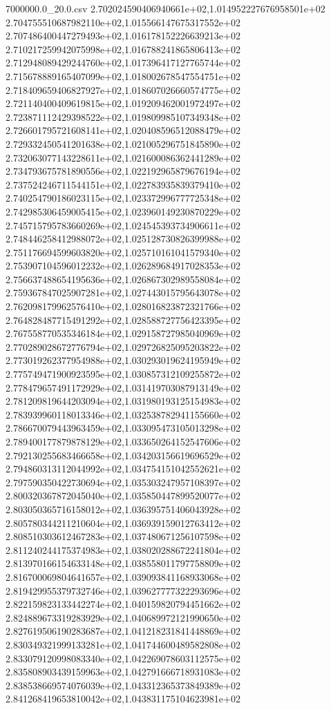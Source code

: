 \begin{filecontents*}{7000000.0_20.0.csv}
2.702024590406940661e+02,1.014952227676958501e+02
2.704755510687982110e+02,1.015566147675317552e+02
2.707486400447279493e+02,1.016178152226639213e+02
2.710217259942075998e+02,1.016788241865806413e+02
2.712948089429244760e+02,1.017396417127765744e+02
2.715678889165407099e+02,1.018002678547554751e+02
2.718409659406827927e+02,1.018607026660574775e+02
2.721140400409619815e+02,1.019209462001972497e+02
2.723871112429398522e+02,1.019809985107349348e+02
2.726601795721608141e+02,1.020408596512088479e+02
2.729332450541201638e+02,1.021005296751845890e+02
2.732063077143228611e+02,1.021600086362441289e+02
2.734793675781890556e+02,1.022192965879676194e+02
2.737524246711544151e+02,1.022783935839379410e+02
2.740254790186023115e+02,1.023372996777725348e+02
2.742985306459005415e+02,1.023960149230870229e+02
2.745715795783660269e+02,1.024545393734906611e+02
2.748446258412988072e+02,1.025128730826399988e+02
2.751176694599603820e+02,1.025710161041579340e+02
2.753907104596012232e+02,1.026289684917028353e+02
2.756637488654195636e+02,1.026867302989558084e+02
2.759367847025907281e+02,1.027443015795643078e+02
2.762098179962576410e+02,1.028016823872321766e+02
2.764828487715491292e+02,1.028588727756423395e+02
2.767558770535346184e+02,1.029158727985040969e+02
2.770289028672776794e+02,1.029726825095203822e+02
2.773019262377954988e+02,1.030293019624195949e+02
2.775749471900923595e+02,1.030857312109255872e+02
2.778479657491172929e+02,1.031419703087913149e+02
2.781209819644203094e+02,1.031980193125154983e+02
2.783939960118013346e+02,1.032538782941155660e+02
2.786670079443963459e+02,1.033095473105013298e+02
2.789400177879878129e+02,1.033650264152547606e+02
2.792130255683466658e+02,1.034203156619696529e+02
2.794860313112044992e+02,1.034754151042552621e+02
2.797590350422730694e+02,1.035303247957108397e+02
2.800320367872045040e+02,1.035850447899520077e+02
2.803050365716158012e+02,1.036395751406043928e+02
2.805780344211210604e+02,1.036939159012763412e+02
2.808510303612467283e+02,1.037480671256107598e+02
2.811240244175374983e+02,1.038020288672241804e+02
2.813970166154633148e+02,1.038558011797758809e+02
2.816700069804641657e+02,1.039093841168933068e+02
2.819429955379732746e+02,1.039627777322293696e+02
2.822159823133442274e+02,1.040159820794451662e+02
2.824889673319283929e+02,1.040689972121990650e+02
2.827619506190283687e+02,1.041218231841448869e+02
2.830349321999133281e+02,1.041744600489582808e+02
2.833079120998083340e+02,1.042269078603112575e+02
2.835808903439159963e+02,1.042791666718931083e+02
2.838538669574076039e+02,1.043312365373849389e+02
2.841268419653810042e+02,1.043831175104623981e+02

\end{filecontents*}
